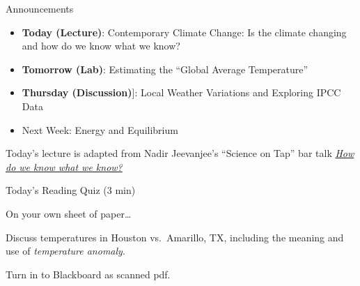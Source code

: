 \documentclass[12pt]{beamer}
\title%
{}
\subtitle
{} %
\author%
{Ben Holder}%
\date%
{}
\begin{document}

\begin{frame}{Announcements}
	\begin{itemize}
	\addtolength{\itemsep}{0.5\baselineskip}
	\item[]{\bf Today (Lecture)}: Contemporary Climate Change: Is the climate changing and how do we know what we know?
	\item[]{\bf Tomorrow (Lab)}: Estimating the ``Global Average Temperature''
	\item[]{\bf Thursday (Discussion)}]: Local Weather Variations and Exploring IPCC Data
	\item Next Week: Energy and Equilibrium
	\end{itemize}
	\vfill
	{\small Today's lecture is adapted from Nadir Jeevanjee's ``Science on Tap'' bar talk \href{https://nadirjeevanjee.com/lectures.html}{\em How do we know what we know?}}

\begin{center}
\end{center}

\end{frame}
\begin{frame}{Today's Reading Quiz (3 min)}

On your own sheet of paper\ldots

\vspace{2cm}

\begin{center}
Discuss temperatures in Houston vs.\ Amarillo, TX, including the meaning and use of {\em temperature anomaly}.
\end{center}

\vspace{2cm}

Turn in to Blackboard as scanned pdf.

\end{frame}
\end{document}
